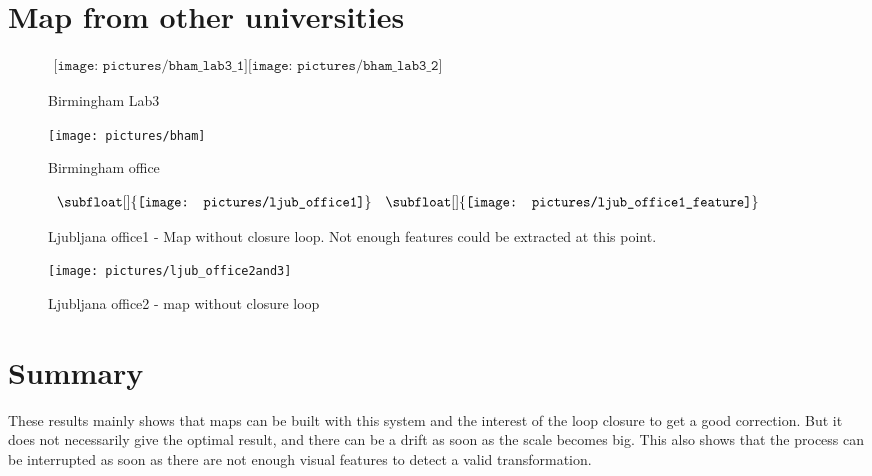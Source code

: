 \clearpage
\section{Map from other universities}

\begin{figure}[H]
\centering$
 \begin{array}{c}
 \texttt{[image: pictures/bham\_lab3\_1]}
 \texttt{[image: pictures/bham\_lab3\_2]}
 \end{array}$
\caption{Birmingham Lab3}
\end{figure}


\begin{figure}[H]
\centering
\texttt{[image: pictures/bham]}
\caption{Birmingham office}
\end{figure}

\begin{figure}[H]
\centering$
 \begin{array}{cc}
 \subfloat[]{\label{fig:ljub1_1} \texttt{[image: pictures/ljub\_office1]}} &
 \subfloat[]{\label{fig:ljub1_2} \texttt{[image: pictures/ljub\_office1\_feature]}}
 \end{array}$
\caption{Ljubljana office1 - \protect{} Map without closure loop. \protect{} Not enough features could be extracted at this point.}
\end{figure}


\begin{figure}[H]
\centering
\texttt{[image: pictures/ljub\_office2and3]}
\caption{Ljubljana office2 - map without closure loop}
\end{figure}

\section{Summary}

These results mainly shows that maps can be built with this system and the interest of the loop closure to get a good correction. But it does not necessarily  give the optimal result, and there can be a drift as soon as the scale becomes big. This also shows that the process can be interrupted as soon as there are not enough visual features to detect a valid transformation.

